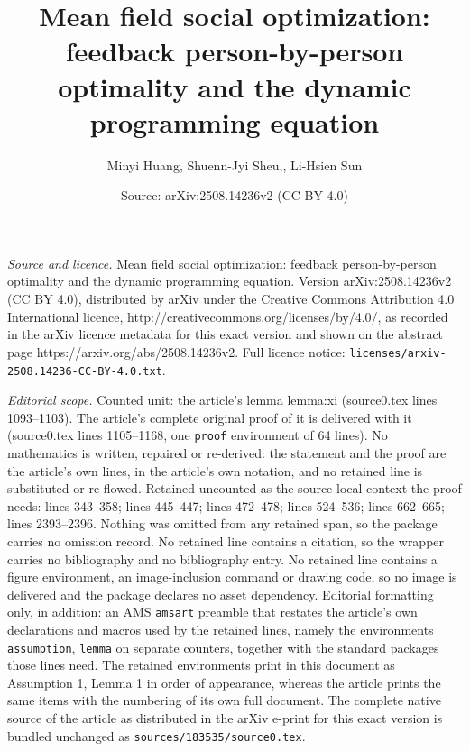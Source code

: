 \documentclass[10pt,a4paper]{amsart}
\title{Mean field social optimization: feedback person-by-person optimality and the dynamic programming equation}
\author{Minyi Huang, Shuenn-Jyi Sheu,, Li-Hsien Sun}
\date{Source: arXiv:2508.14236v2 (CC BY 4.0)}
\begin{document}
\maketitle

\noindent\emph{Source and licence.} Mean field social optimization: feedback person-by-person optimality and the dynamic programming equation. Version arXiv:2508.14236v2 (CC BY 4.0), distributed by arXiv under the Creative Commons Attribution 4.0 International licence, http://creativecommons.org/licenses/by/4.0/, as recorded in the arXiv licence metadata for this exact version and shown on the abstract page https://arxiv.org/abs/2508.14236v2. Full licence notice: \texttt{licenses/arxiv-2508.14236-CC-BY-4.0.txt}.\par\smallskip

\noindent\textit{Editorial scope.} Counted unit: the article's lemma lemma:xi (source0.tex lines 1093--1103). The article's complete original proof of it is delivered with it (source0.tex lines 1105--1168, one \texttt{proof} environment of 64 lines). No mathematics is written, repaired or re-derived: the statement and the proof are the article's own lines, in the article's own notation, and no retained line is substituted or re-flowed.  Retained uncounted as the source-local context the proof needs: lines 343--358; lines 445--447; lines 472--478; lines 524--536; lines 662--665; lines 2393--2396.  Nothing was omitted from any retained span, so the package carries no omission record.  No retained line contains a citation, so the wrapper carries no bibliography and no bibliography entry.  No retained line contains a figure environment, an image-inclusion command or drawing code, so no image is delivered and the package declares no asset dependency.  Editorial formatting only, in addition: an AMS \texttt{amsart} preamble that restates the article's own declarations and macros used by the retained lines, namely the environments \texttt{assumption}, \texttt{lemma} on separate counters, together with the standard packages those lines need.  The retained environments print in this document as Assumption 1, Lemma 1 in order of appearance, whereas the article prints the same items with the numbering of its own full document.  The complete native source of the article as distributed in the arXiv e-print for this exact version is bundled unchanged as \texttt{sources/183535/source0.tex}.
\end{document}
